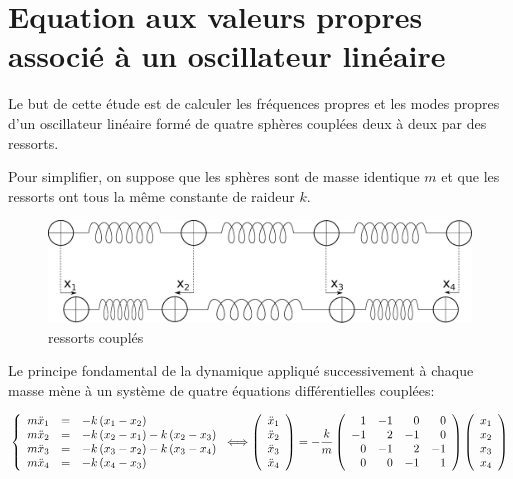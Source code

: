 \documentclass[a4paper, 10pt]{article}
\begin{document}
\section{Equation aux valeurs propres associé à un oscillateur linéaire}


Le but de cette étude est de calculer les fréquences propres et les modes propres d'un oscillateur
linéaire formé de  quatre sphères  couplées deux à deux par des ressorts. 

Pour simplifier, on suppose que les sphères sont de masse identique $m$ et que les  ressorts
ont tous la même constante de  raideur $k$.   

\begin{figure}[!h]
\centering
\includegraphics[scale=0.4]{spring4m.eps}
\caption{ressorts couplés}
\label{Res}
\end{figure}


Le principe fondamental de la dynamique appliqué successivement à chaque masse mène à un système
de quatre équations différentielles couplées:

$$
\left \{
\begin{array}{r c l}
m \ddot x_1 &=& -k \, (x_1-x_2)  \\
m \ddot x_2 &=& -k \, (x_2-x_1)  -k \, (x_2-x_3) \\
m \ddot x_3  &=&  -k \,(x_3-x_2) -k \,(x_3-x_4)\\
m \ddot x_4 &=& -k \, (x_4-x_3)  
\end{array}
\right .
\Longleftrightarrow
\left(
\begin{array}{c}
 \ddot x_1 \\  \ddot x_2 \\  \ddot x_3 \\  \ddot x_4
\end{array}
\right) = - {k \over m}
\left(
\begin{array}{rrrr}
1   & -1 & 0  & 0  \\
-1  & 2 & -1 & 0 \\
0  & -1 & 2 & -1 \\
0  & 0 & -1 & 1 \\
\end{array}
\right)
\left(
\begin{array}{c}
x_1 \\ x_2 \\ x_3 \\ x_4
\end{array}
\right)
$$
\end{document}
